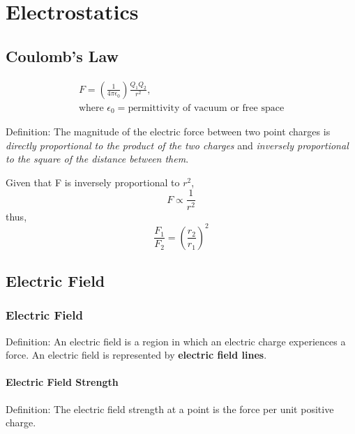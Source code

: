 \documentclass[../../../main.tex]{subfiles}
\begin{document}
\setcounter{chapter}{11}
\chapter{Electrostatics}

\section{Coulomb's Law}

\begin{gather*}
    F=(\frac{1}{4\pi\epsilon_0})\frac{Q_1Q_2}{r^2}, \\
    \text{where } \epsilon_0= \text{permittivity of vacuum or free space}
\end{gather*}

\begin{mdframed}
    Definition: The magnitude of the electric force between two point charges is \emph{directly proportional to the product of the two charges} and \emph{inversely proportional to the square of the distance between them}.
\end{mdframed}
Given that F is inversely proportional to \(r^2\),
\begin{equation}
    F \propto \frac{1}{r^2}
\end{equation}
thus,
\begin{equation}
    \frac{F_1}{F_2}=(\frac{r_2}{r_1})^2
\end{equation}

\section{Electric Field}

\subsection{Electric Field}
\begin{mdframed}
    Definition: An electric field is a region in which an electric charge experiences a force. An electric field is represented by \textbf{electric field lines}.
\end{mdframed}

\pagebreak

\subsubsection{Electric Field Strength}
\begin{mdframed}
    Definition: The electric field strength at a point is the force per unit positive charge.
\end{mdframed}
\end{document}

